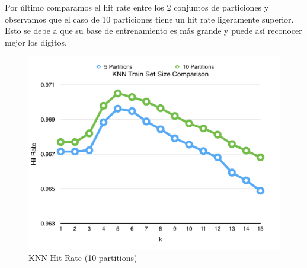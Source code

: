 Por último comparamos el hit rate entre los 2 conjuntos de particiones y observamos que el caso de 10 particiones tiene un hit rate ligeramente superior. Esto se debe a que su base de entrenamiento es más grande y puede así reconocer mejor los dígitos.\\

\begin{figure}[h!]
  \begin{center}
	\includegraphics[scale=0.6]{exp1/KNN-Train-Set-Size.png}
	\caption{KNN Hit Rate (10 partitions)}
  \end{center}
\end{figure}



